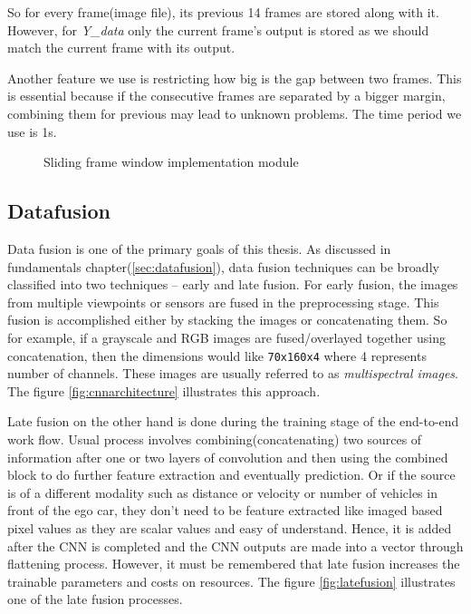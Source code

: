 So for every frame(image file), its previous 14 frames are stored along with it. However,
for \textit{Y\_{data}} only the current frame's output is stored as we should match the
current frame with its output.

Another feature we use is restricting how big is the gap between two frames. This is
essential because if the consecutive frames are separated by a bigger margin, combining
them for previous may lead to unknown problems. The time period we use is 1s.
\begin{figure}[h]
	\centering
    \def\svgwidth{0.8\textwidth}
    \caption{Sliding frame window implementation module}
    \label{fig:slidingwindow}
\end{figure}

\subsection{Datafusion}
\label{chap05Implsubsec:datafusion1}
Data fusion is one of the primary goals of this thesis. As discussed in fundamentals
chapter(\ref{sec:datafusion}), data fusion techniques can be broadly classified  into two techniques -- early and late
fusion. For early fusion, the images from multiple viewpoints or sensors are fused in the
preprocessing stage. This fusion is accomplished either by stacking the images or
concatenating them. So for example, if a grayscale and RGB images are fused/overlayed together using
concatenation, then the dimensions would like \texttt{70x160x4} where 4 represents number
of channels. These images are usually referred to as \textit{multispectral images}. The figure \ref{fig:cnnarchitecture} illustrates this approach.

Late fusion on the other hand is done during the training stage of the end-to-end work
flow. Usual process involves combining(concatenating) two sources of information after one
or two layers of convolution and then using the combined block to do further feature
extraction and eventually prediction. Or if the source is of a different modality such as
distance or velocity or number of vehicles in front of the ego car, they don't need to be
feature extracted like imaged based pixel values as they are scalar values and easy of
understand. Hence, it is added after the CNN is completed and the CNN outputs are made
into a vector through flattening process. However, it must be remembered that late fusion increases the
trainable parameters and costs on resources. The figure \ref{fig:latefusion} illustrates
one of the late fusion processes.


